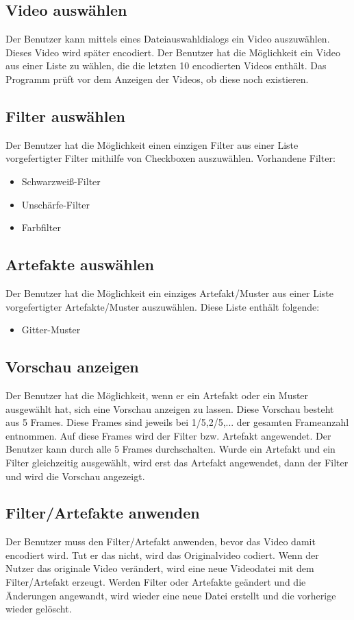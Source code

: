 \documentclass[parskip=full]{scrartcl}
\begin{document}
\subsection{Video auswählen}
Der Benutzer kann mittels eines Dateiauswahldialogs ein Video auszuwählen. Dieses
Video wird später encodiert. Der Benutzer hat die Möglichkeit ein Video aus einer Liste zu wählen, die die letzten 10 encodierten
Videos enthält. Das Programm prüft vor dem Anzeigen der Videos, ob diese noch existieren.
\subsection{Filter auswählen}
Der Benutzer hat die Möglichkeit einen einzigen Filter aus einer Liste vorgefertigter Filter mithilfe von Checkboxen auszuwählen. Vorhandene Filter:
\begin{itemize}
\item Schwarzweiß-Filter
\item Unschärfe-Filter
\item Farbfilter
\end{itemize}
\subsection{Artefakte auswählen}
Der Benutzer hat die Möglichkeit ein einziges Artefakt/Muster aus einer Liste vorgefertigter
Artefakte/Muster auszuwählen. Diese Liste enthält folgende:
\begin{itemize}
\item Gitter-Muster
\end{itemize}
\subsection{Vorschau anzeigen}
Der Benutzer hat die Möglichkeit, wenn er ein Artefakt oder ein Muster ausgewählt hat, sich eine
Vorschau anzeigen zu lassen. Diese Vorschau besteht aus 5 Frames. Diese Frames sind jeweils bei
1/5,2/5,... der gesamten Frameanzahl entnommen. Auf diese Frames wird der Filter bzw. Artefakt
angewendet. Der Benutzer kann durch alle 5 Frames durchschalten. Wurde ein Artefakt und ein Filter
gleichzeitig ausgewählt, wird erst das Artefakt angewendet, dann der Filter und wird die
Vorschau angezeigt.
\subsection{Filter/Artefakte anwenden}
Der Benutzer muss den Filter/Artefakt anwenden, bevor das Video damit encodiert wird. Tut er
das nicht, wird das Originalvideo codiert. Wenn der Nutzer das originale Video verändert, wird eine neue Videodatei mit
dem Filter/Artefakt erzeugt. Werden Filter oder Artefakte geändert und die Änderungen angewandt, wird wieder eine neue
Datei erstellt und die vorherige wieder gelöscht.
\end{document}
